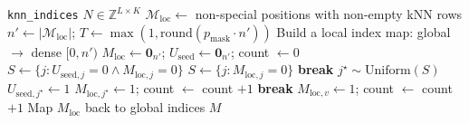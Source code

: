 \documentclass[11pt]{article}
\newcommand{\pmask}{p_{\text{mask}}}
\begin{document}
\begin{algorithm}[H]
\caption{Structure Masking: Seed-and-Grow}
\begin{algorithmic}[1]
\Require \texttt{knn\_indices} $N \in \mathbb{Z}^{L \times K}$
\State $\mathcal{M}_{\text{loc}} \gets$ non-special positions with non-empty kNN rows
\State $n' \gets |\mathcal{M}_{\text{loc}}|$; $T \gets \max(1, \text{round}(\pmask \cdot n'))$
\State Build a local index map: global $\to$ dense $[0, n')$
\State $M_{\text{loc}} \gets \mathbf{0}_{n'}$; $U_{\text{seed}} \gets \mathbf{0}_{n'}$; count $\gets 0$
  \State $S \gets \{j : U_{\text{seed},j} = 0 \wedge M_{\text{loc},j} = 0\}$
   $S \gets \{j : M_{\text{loc},j} = 0\}$ \EndIf
   \textbf{break} \EndIf
  \State $j^{\star} \sim \text{Uniform}(S)$
  \State $U_{\text{seed},j^{\star}} \gets 1$
    \State $M_{\text{loc},j^{\star}} \gets 1$; count $\gets$ count $+ 1$
  \EndIf
     \textbf{break} \EndIf
      \State $M_{\text{loc},v} \gets 1$; count $\gets$ count $+ 1$
    \EndIf
  \EndFor
\EndWhile
\State Map $M_{\text{loc}}$ back to global indices
\State \Return $M$
\end{algorithmic}
\end{algorithm}
\end{document}
